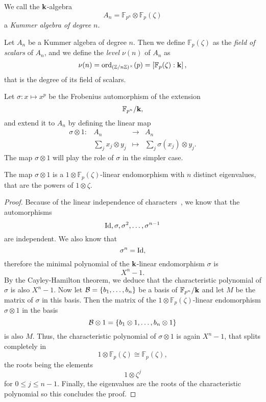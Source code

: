 \begin{defi}
 We call the $\mathbf{k}$-algebra
 \[
   A_n = \mathbb{F}_{p^n}\otimes\mathbb{F}_{p}(\zeta)
 \]
 a \emph{Kummer algebra of degree $n$}.
\end{defi}
\begin{defi}
  Let $A_n$ be a Kummer algebra of degree $n$. Then we define
  $\mathbb{F}_{p}(\zeta)$ as the \emph{field of scalars} of $A_n$, and we
  define the \emph{level} $\nu(n)$ of $A_n$ as
  \[
    \nu(n) = \mathrm{ord}_{(\mathbb{Z}/n\mathbb{Z})^\times}(p) = \left[
      \mathbb{F}_{p}(\zeta):\mathbf{k} \right],
  \]
  that is the degree of its field of scalars.
\end{defi}
Let $\sigma:x\mapsto x^p$ be the Frobenius automorphism of the extension
\[
  \mathbb{F}_{p^n}/\mathbf{k},
\]
and extend it to $A_n$ by defining the linear map
\[
  \begin{array}{cccc}
    \sigma\otimes 1: & A_n & \to & A_n\\
    & \sum_j x_j\otimes y_j & \mapsto & \sum_j \sigma(x_j) \otimes y_j.
  \end{array}
\]
The map $\sigma\otimes 1$ will play the role of $\sigma$ in the simpler case.
\begin{lm}
  The map $\sigma\otimes1$ is a $1\otimes\mathbb{F}_{p}(\zeta)$-linear
  endomorphism with $n$ distinct eigenvalues, that are the powers of
  $1\otimes\zeta$.
\end{lm}
\begin{proof}
  Because of the linear independence of characters~\cite[Chapter VI,
  §4]{Lang04}, we know that the automorphisms
  \[
    \operatorname{Id}, \sigma, \sigma^2, \dots, \sigma^{n-1}
  \]
  are independent. We also know that 
  \[
    \sigma^n = \operatorname{Id},
  \]
  therefore the minimal polynomial of the $\mathbf{k}$-linear endomorphism $\sigma$ is
  \[
    X^n-1.
  \]
  By the Cayley-Hamilton theorem, we deduce that the characteristic
  polynomial of $\sigma$ is also $X^n-1$. Now let $\mathcal{B}=\left\{ b_1, \dots, b_n \right\}$ be a basis of
  $\mathbb{F}_{p^n}/\mathbf{k}$ and let $M$ be the matrix of $\sigma$ in this basis.
  Then the matrix of the $1\otimes\mathbb{F}_p(\zeta)$-linear endomorphism
  $\sigma\otimes1$ in the basis
  \[
    \mathcal{B}\otimes 1 =\left\{ b_1\otimes1, \dots, b_n\otimes1 \right\}
  \]
  is also $M$. Thus, the characteristic polynomial of $\sigma\otimes1$ is again
  $X^n-1$, that splits completely in 
  \[
    1\otimes\mathbb{F}_{p}(\zeta)\cong \mathbb{F}_{p}(\zeta),
  \]
  the roots being the elements
  \[
    1\otimes\zeta^j
  \]
  for $0\leq j\leq n-1$. Finally, the eigenvalues are the roots of the
  characteristic polynomial so this concludes the proof.
\end{proof}
